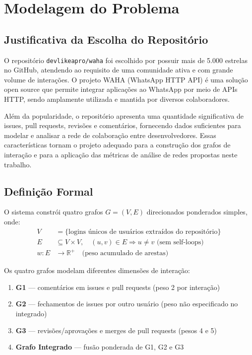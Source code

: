 \documentclass[12pt,a4paper]{article}
\begin{document}
\section{Modelagem do Problema}\label{sec:modelagem}

\subsection{Justificativa da Escolha do Repositório}

O repositório \texttt{devlikeapro/waha} foi escolhido por possuir mais de 5.000 estrelas no GitHub, atendendo ao requisito de uma comunidade ativa e com grande volume de interações. O projeto WAHA (WhatsApp HTTP API) é uma solução open source que permite integrar aplicações ao WhatsApp por meio de APIs HTTP, sendo amplamente utilizada e mantida por diversos colaboradores.

Além da popularidade, o repositório apresenta uma quantidade significativa de issues, pull requests, revisões e comentários, fornecendo dados suficientes para modelar e analisar a rede de colaboração entre desenvolvedores. Essas características tornam o projeto adequado para a construção dos grafos de interação e para a aplicação das métricas de análise de redes propostas neste trabalho.

\subsection{Definição Formal}

O sistema constrói quatro grafos $G = (V, E)$ direcionados ponderados simples, onde:
\begin{align}
  V &= \{\text{logins únicos de usuários extraídos do repositório}\} \\
  E &\subseteq V \times V, \quad (u, v) \in E \Rightarrow u \neq v \text{ (sem self-loops)} \\
  w: E &\to \mathbb{R}^+ \quad \text{(peso acumulado de arestas)}
\end{align}

Os quatro grafos modelam diferentes dimensões de interação:
\begin{enumerate}
  \item \textbf{G1} — comentários em issues e pull requests (peso 2 por interação)
  \item \textbf{G2} — fechamentos de issues por outro usuário (peso não especificado no integrado)
  \item \textbf{G3} — revisões/aprovações e merges de pull requests (pesos 4 e 5)
  \item \textbf{Grafo Integrado} — fusão ponderada de G1, G2 e G3
\end{enumerate}
\end{document}
